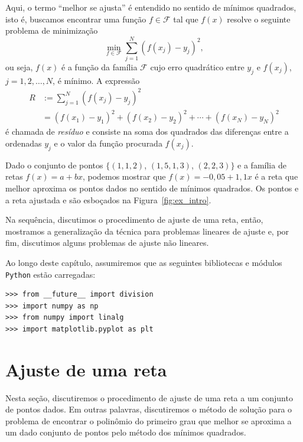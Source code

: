 Aqui, o termo ``melhor se ajusta'' é entendido no sentido de mínimos quadrados, isto é, buscamos encontrar uma função $f\in\mathcal{F}$ tal que $f(x)$ resolve o seguinte problema de minimização
\begin{equation}
  \min_{f\in\mathcal{F}} \sum_{j=1}^N \left(f(x_j) - y_j\right)^2,
\end{equation}
ou seja, $f(x)$ é a função da família $\mathcal{F}$ cujo erro quadrático entre $y_j$ e $f(x_j)$, $j = 1, 2, \dotsc, N$, é mínimo. A expressão
\begin{equation}
  \begin{split}
  R &:= \sum_{j=1}^N \left(f(x_j)-y_j\right)^2 \\
  &= \left(f(x_1)-y_1\right)^2 +  \left(f(x_2)-y_2\right)^2 + \cdots + \left(f(x_N)- y_N\right)^2    
  \end{split}
\end{equation}
é chamada de \emph{resíduo} e consiste na soma dos quadrados das diferenças entre a ordenadas $y_j$ e o valor da função procurada $f(x_j)$.

\begin{ex}\label{ex:intro_ajuste}
  Dado o conjunto de pontos $\{(1, 1,2)$, $(1,5, 1,3)$, $(2, 2,3)\}$ e a família de retas $f(x) = a + bx$, podemos mostrar que $f(x) = -0,05 + 1,1x$ é a reta que melhor aproxima os pontos dados no sentido de mínimos quadrados.  Os pontos e a reta ajustada e são esboçados na Figura~\ref{fig:ex_intro}.
\end{ex}

Na sequência, discutimos o procedimento de ajuste de uma reta, então, mostramos a generalização da técnica para problemas lineares de ajuste e, por fim, discutimos alguns problemas de ajuste não lineares.

\ifispython
  Ao longo deste capítulo, assumiremos que as seguintes bibliotecas e módulos \verb+Python+ estão carregadas:
\begin{verbatim}
>>> from __future__ import division
>>> import numpy as np
>>> from numpy import linalg
>>> import matplotlib.pyplot as plt
\end{verbatim}
\fi


\section{Ajuste de uma reta}

Nesta seção, discutiremos o procedimento de ajuste de uma reta a um conjunto de pontos dados. Em outras palavras, discutiremos o método de solução para o problema de encontrar o polinômio do primeiro grau que melhor se aproxima a um dado conjunto de pontos pelo método dos mínimos quadrados. 

